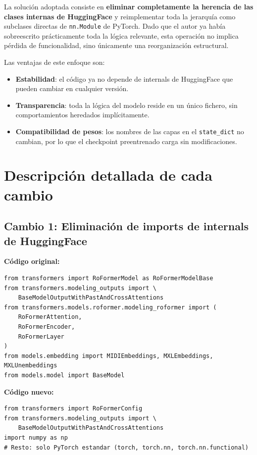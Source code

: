 \documentclass[12pt,a4paper]{article}
\begin{document}
La solución adoptada consiste en \textbf{eliminar completamente la herencia de las
clases internas de HuggingFace} y reimplementar toda la jerarquía como subclases
directas de \texttt{nn.Module} de PyTorch. Dado que el autor ya había sobreescrito
prácticamente toda la lógica relevante, esta operación no implica pérdida de
funcionalidad, sino únicamente una reorganización estructural.

Las ventajas de este enfoque son:
\begin{itemize}
  \item \textbf{Estabilidad}: el código ya no depende de internals de HuggingFace
        que pueden cambiar en cualquier versión.
  \item \textbf{Transparencia}: toda la lógica del modelo reside en un único fichero,
        sin comportamientos heredados implícitamente.
  \item \textbf{Compatibilidad de pesos}: los nombres de las capas en el
        \texttt{state\_dict} no cambian, por lo que el checkpoint preentrenado
        carga sin modificaciones.
\end{itemize}

\section{Descripción detallada de cada cambio}

\subsection{Cambio 1: Eliminación de imports de internals de HuggingFace}

\textbf{Código original:}
\begin{lstlisting}[caption={Imports originales en roformer.py}]
from transformers import RoFormerModel as RoFormerModelBase
from transformers.modeling_outputs import \
    BaseModelOutputWithPastAndCrossAttentions
from transformers.models.roformer.modeling_roformer import (
    RoFormerAttention,
    RoFormerEncoder,
    RoFormerLayer
)
from models.embedding import MIDIEmbeddings, MXLEmbeddings, MXLUnembeddings
from models.model import BaseModel
\end{lstlisting}

\textbf{Código nuevo:}
\begin{lstlisting}[caption={Imports corregidos en roformer.py}]
from transformers import RoFormerConfig
from transformers.modeling_outputs import \
    BaseModelOutputWithPastAndCrossAttentions
import numpy as np
# Resto: solo PyTorch estandar (torch, torch.nn, torch.nn.functional)
\end{lstlisting}
\end{document}
